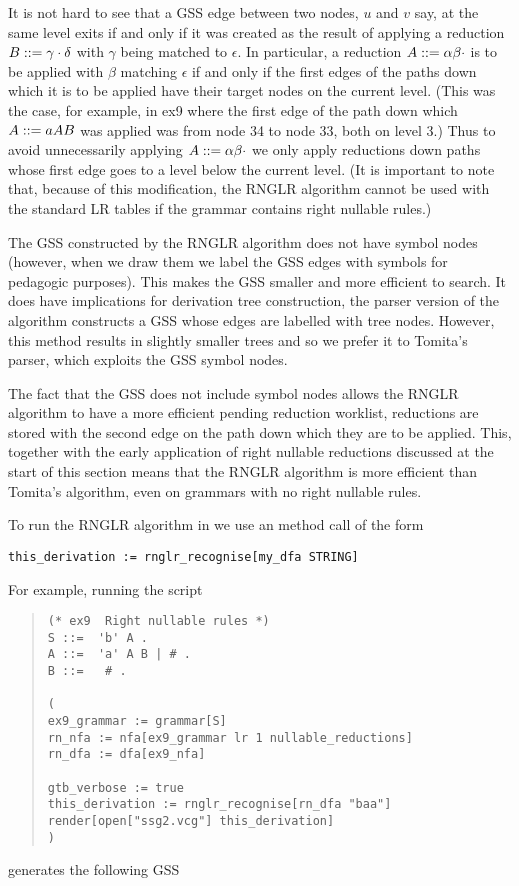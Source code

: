 It is not hard to see that a GSS edge between two nodes, $u$ and $v$
say, at the same level exits if and only if it was created as the
result of applying a reduction $B::=\gamma\cdot\delta$ with 
$\gamma$ being matched to $\epsilon$. In particular,
a reduction $A::=\alpha\beta\cdot$
is to be applied with $\beta$ matching $\epsilon$ if and only if
the first edges of the paths down which it is to be applied have 
their target nodes on the current level. (This was the case, for 
example, in ex9 where the
first edge of the path down which $A::= aAB$ was applied was from
node 34 to node 33, both on level 3.)
Thus to avoid unnecessarily applying $A::=\alpha\beta\cdot$
we only apply reductions down paths whose first edge goes to a level
below the current level. (It is important to note that, because of this
modification, the RNGLR algorithm cannot be used with the standard LR
tables if the grammar contains right nullable rules.)

The GSS constructed by the RNGLR algorithm does not have symbol nodes
(however, when we draw them we label the GSS edges with symbols for
pedagogic purposes).
This makes the GSS smaller and more efficient to search. It does have
implications for derivation tree construction, the parser version of
the algorithm constructs a GSS whose edges are labelled with tree
nodes. However, this method results in slightly smaller trees and so
we prefer it to Tomita's parser, which exploits the GSS symbol nodes.

The fact that the GSS does not include symbol nodes allows the RNGLR
algorithm to have a more efficient pending reduction worklist,
reductions are stored with the second edge on the path down which they
are to be applied. This, together with the early application of right
nullable reductions discussed at the start of this section means that
the RNGLR algorithm is more efficient than Tomita's algorithm, even on
grammars with no right nullable rules.

To run the RNGLR algorithm in \gtb we use an method call of the form
\begin{center}\label{p_rnglr}
\verb+this_derivation := rnglr_recognise[my_dfa STRING]+
\end{center}
For example, running the script 
\begin{quote}
\begin{verbatim}
(* ex9  Right nullable rules *)
S ::=  'b' A .
A ::=  'a' A B | # .
B ::=   # .

(
ex9_grammar := grammar[S]
rn_nfa := nfa[ex9_grammar lr 1 nullable_reductions]
rn_dfa := dfa[ex9_nfa]

gtb_verbose := true
this_derivation := rnglr_recognise[rn_dfa "baa"]
render[open["ssg2.vcg"] this_derivation]
)
\end{verbatim}
\end{quote}
generates the following GSS
\begin{center}
\\[2mm]
\end{center}


